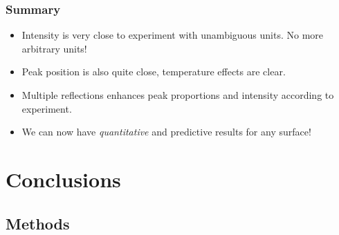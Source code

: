 \documentclass{beamer}
\begin{document}
\begin{frame}
\frametitle{Summary}
\begin{itemize}
\item Intensity is very close to experiment with unambiguous units. No more arbitrary units!
\item Peak position is also quite close, temperature effects are clear.
\item Multiple reflections enhances peak proportions and intensity according to experiment.
\item We can now have \emph{quantitative} and predictive results for any surface!
\end{itemize}
\end{frame}



\section{Conclusions}



\subsection{Methods}
\end{document}
